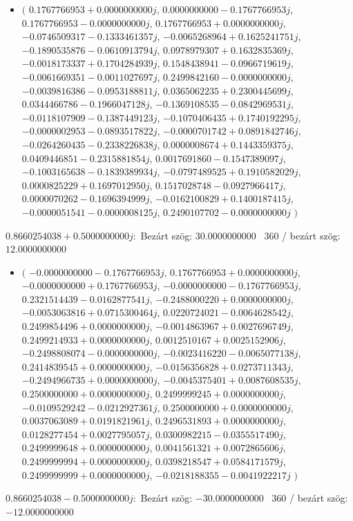 \documentclass[14pt,a4paper]{article}
\begin{document}
\begin{itemize}
\item
$\big($
$0.1767766953+0.0000000000j$, $0.0000000000-0.1767766953j$, $0.1767766953-0.0000000000j$, $0.1767766953+0.0000000000j$, $-0.0746509317-0.1333461357j$, $-0.0065268964+0.1625241751j$, $-0.1890535876-0.0610913794j$, $0.0978979307+0.1632835369j$, $-0.0018173337+0.1704284939j$, $0.1548438941-0.0966719619j$, $-0.0061669351-0.0011027697j$, $0.2499842160-0.0000000000j$, $-0.0039816386-0.0953188811j$, $0.0365062235+0.2300445699j$, $0.0344466786-0.1966047128j$, $-0.1369108535-0.0842969531j$, $-0.0118107909-0.1387449123j$, $-0.1070406435+0.1740192295j$, $-0.0000002953-0.0893517822j$, $-0.0000701742+0.0891842746j$, $-0.0264260435-0.2338226838j$, $0.0000008674+0.1443359375j$, $0.0409446851-0.2315881854j$, $0.0017691860-0.1547389097j$, $-0.1003165638-0.1839389934j$, $-0.0797489525+0.1910582029j$, $0.0000825229+0.1697012950j$, $0.1517028748-0.0927966417j$, $0.0000070262-0.1696394999j$, $-0.0162100829+0.1400187415j$, $-0.0000051541-0.0000008125j$, $0.2490107702-0.0000000000j$
$\big)$
\end{itemize}
$0.8660254038+0.5000000000j$:\
Bezárt szög: $30.0000000000$ \
360 / bezárt szög: $12.0000000000$\
\begin{itemize}
\item
$\big($
$-0.0000000000-0.1767766953j$, $0.1767766953+0.0000000000j$, $-0.0000000000+0.1767766953j$, $-0.0000000000-0.1767766953j$, $0.2321514439-0.0162877541j$, $-0.2488000220+0.0000000000j$, $-0.0053063816+0.0715300464j$, $0.0220724021-0.0064628542j$, $0.2499854496+0.0000000000j$, $-0.0014863967+0.0027696749j$, $0.2499214933+0.0000000000j$, $0.0012510167+0.0025152906j$, $-0.2498808074-0.0000000000j$, $-0.0023416220-0.0065077138j$, $0.2414839545+0.0000000000j$, $-0.0156356828+0.0273711343j$, $-0.2494966735+0.0000000000j$, $-0.0045375401+0.0087608535j$, $0.2500000000+0.0000000000j$, $0.2499999245+0.0000000000j$, $-0.0109529242-0.0212927361j$, $0.2500000000+0.0000000000j$, $0.0037063089+0.0191821961j$, $0.2496531893+0.0000000000j$, $0.0128277454+0.0027795057j$, $0.0300982215-0.0355517490j$, $0.2499999648+0.0000000000j$, $0.0041561321+0.0072865606j$, $0.2499999994+0.0000000000j$, $0.0398218547+0.0584171579j$, $0.2499999999+0.0000000000j$, $-0.0218188355-0.0041922217j$
$\big)$
\end{itemize}
$0.8660254038-0.5000000000j$:\
Bezárt szög: $-30.0000000000$ \
360 / bezárt szög: $-12.0000000000$\
\end{document}

